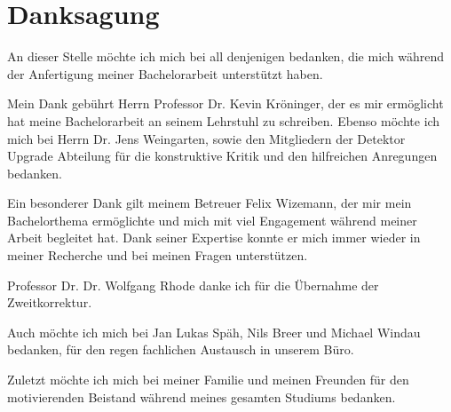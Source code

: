 \thispagestyle{empty}
\section*{Danksagung}

An dieser Stelle möchte ich mich bei all denjenigen bedanken, die mich während
der Anfertigung meiner Bachelorarbeit unterstützt haben.

Mein Dank gebührt Herrn Professor Dr. Kevin Kröninger, der es mir ermöglicht hat
meine Bachelorarbeit an seinem Lehrstuhl zu schreiben.
Ebenso möchte ich mich bei Herrn Dr. Jens Weingarten, sowie den Mitgliedern der
Detektor Upgrade Abteilung für die konstruktive Kritik und den hilfreichen Anregungen bedanken.

Ein besonderer Dank gilt meinem Betreuer Felix Wizemann, der mir
mein Bachelorthema ermöglichte und mich mit viel Engagement
während meiner Arbeit begleitet hat. Dank seiner Expertise konnte er mich immer wieder in meiner
Recherche und bei meinen Fragen unterstützen.

Professor Dr. Dr. Wolfgang Rhode danke ich für die Übernahme der Zweitkorrektur.

Auch möchte ich mich bei Jan Lukas Späh, Nils Breer und Michael Windau bedanken, für
den regen fachlichen Austausch in unserem Büro.

Zuletzt möchte ich mich bei meiner Familie und meinen Freunden für den motivierenden Beistand
während meines gesamten Studiums bedanken.
